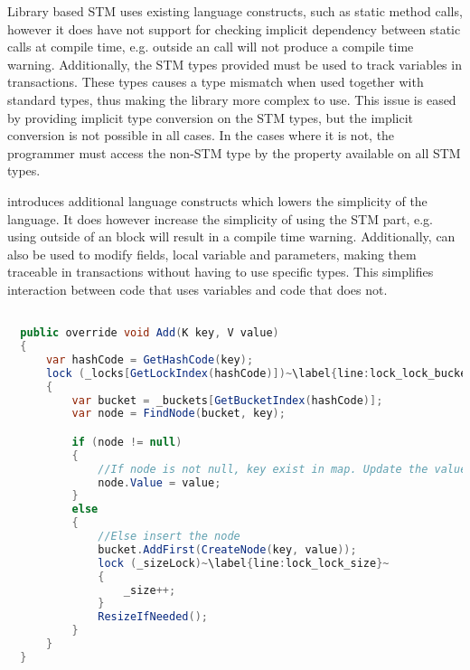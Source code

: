 Library based \ac{STM} uses existing language constructs, such as static method calls, however it does have not support for checking implicit dependency between static calls at compile time, e.g.  outside an  call will not produce a compile time warning. Additionally, the \ac{STM} types provided must be used to track variables in transactions. These types causes a type mismatch when used together with standard types, thus making the library more complex to use. This issue is eased by providing implicit type conversion on the \ac{STM} types, but the implicit conversion is not possible in all cases. In the cases where it is not, the programmer must access the non-\ac{STM} type by the  property available on all \ac{STM} types. 

\stmnamesp introduces additional language constructs which lowers the simplicity of the language. It does however increase the simplicity of using the \ac{STM} part, e.g. using  outside of an  block will result in a compile time warning. Additionally,  can also be used to modify fields, local variable and parameters, making them traceable in transactions without having to use specific types. This simplifies interaction between code that uses  variables and code that does not. 

\begin{lstlisting}[float,label=lst:lock_add_hashmap,
  caption={ConcurrentHashMap \bscode{Add} Method - Locking},
  language=Java,  
  showspaces=false,
  showtabs=false,
  breaklines=true,
  showstringspaces=false,
  breakatwhitespace=true,
  escapechar=~,
  commentstyle=\color{greencomments},
  keywordstyle=\color{bluekeywords},
  stringstyle=\color{redstrings},
  morekeywords={atomic, retry, orelse, var, get, set, ref, out}]  % Start your code-block

  public override void Add(K key, V value)
  {
      var hashCode = GetHashCode(key);
      lock (_locks[GetLockIndex(hashCode)])~\label{line:lock_lock_bucket}~
      {
          var bucket = _buckets[GetBucketIndex(hashCode)];
          var node = FindNode(bucket, key);

          if (node != null)
          {
              //If node is not null, key exist in map. Update the value
              node.Value = value;
          }
          else
          {
              //Else insert the node
              bucket.AddFirst(CreateNode(key, value));
              lock (_sizeLock)~\label{line:lock_lock_size}~
              {
                  _size++;
              }
              ResizeIfNeeded();
          }
      }
  }
\end{lstlisting}

